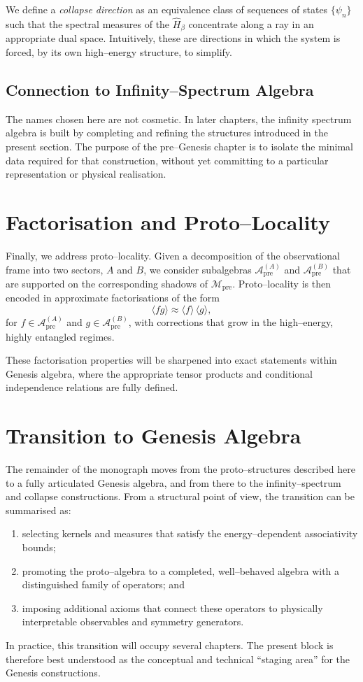 We define a \emph{collapse direction} as an equivalence class of sequences of
states $\{\psi_n\}$ such that the spectral measures of the $\hat{H}_\beta$
concentrate along a ray in an appropriate dual space. Intuitively, these are
directions in which the system is forced, by its own high--energy structure,
to simplify.

\subsection{Connection to Infinity--Spectrum Algebra}
The names chosen here are not cosmetic. In later chapters, the infinity
spectrum algebra is built by completing and refining the structures
introduced in the present section. The purpose of the pre--Genesis chapter is
to isolate the minimal data required for that construction, without yet
committing to a particular representation or physical realisation.

\section{Factorisation and Proto--Locality}
Finally, we address proto--locality. Given a decomposition of the observational
frame into two sectors, $A$ and $B$, we consider subalgebras
$\mathcal{A}_\mathrm{pre}^{(A)}$ and $\mathcal{A}_\mathrm{pre}^{(B)}$ that
are supported on the corresponding shadows of $\mathcal{M}_\mathrm{pre}$.
Proto--locality is then encoded in approximate factorisations of the form
\begin{equation}
  \langle fg \rangle \approx \langle f \rangle\, \langle g \rangle,
\end{equation}
for $f \in \mathcal{A}_\mathrm{pre}^{(A)}$ and
$g \in \mathcal{A}_\mathrm{pre}^{(B)}$, with corrections that grow in the
high--energy, highly entangled regimes.

These factorisation properties will be sharpened into exact statements within
Genesis algebra, where the appropriate tensor products and conditional
independence relations are fully defined.

\section{Transition to Genesis Algebra}
The remainder of the monograph moves from the proto--structures described
here to a fully articulated Genesis algebra, and from there to the
infinity--spectrum and collapse constructions. From a structural point of
view, the transition can be summarised as:
\begin{enumerate}
  \item selecting kernels and measures that satisfy the energy--dependent
        associativity bounds;
  \item promoting the proto--algebra to a completed, well--behaved algebra
        with a distinguished family of operators; and
  \item imposing additional axioms that connect these operators to physically
        interpretable observables and symmetry generators.
\end{enumerate}

In practice, this transition will occupy several chapters. The present block
is therefore best understood as the conceptual and technical ``staging area''
for the Genesis constructions.
